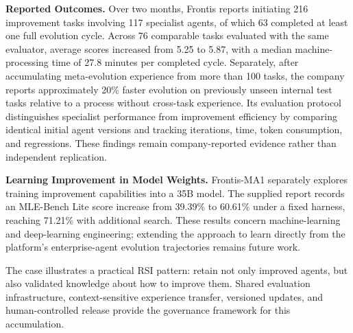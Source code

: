 \textbf{Reported Outcomes.} Over two months, Frontis reports initiating 216 improvement tasks involving 117 specialist agents, of which 63 completed at least one full evolution cycle. Across 76 comparable tasks evaluated with the same evaluator, average scores increased from 5.25 to 5.87, with a median machine-processing time of 27.8 minutes per completed cycle. Separately, after accumulating meta-evolution experience from more than 100 tasks, the company reports approximately 20\% faster evolution on previously unseen internal test tasks relative to a process without cross-task experience. Its evaluation protocol distinguishes specialist performance from improvement efficiency by comparing identical initial agent versions and tracking iterations, time, token consumption, and regressions. These findings remain company-reported evidence rather than independent replication.

\textbf{Learning Improvement in Model Weights.} Frontis-MA1 separately explores training improvement capabilities into a 35B model. The supplied report records an MLE-Bench Lite score increase from 39.39\% to 60.61\% under a fixed harness, reaching 71.21\% with additional search. These results concern machine-learning and deep-learning engineering; extending the approach to learn directly from the platform’s enterprise-agent evolution trajectories remains future work.

The case illustrates a practical RSI pattern: retain not only improved agents, but also validated knowledge about how to improve them. Shared evaluation infrastructure, context-sensitive experience transfer, versioned updates, and human-controlled release provide the governance framework for this accumulation.




